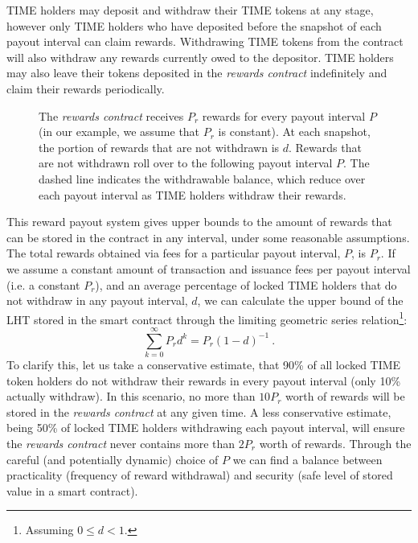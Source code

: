 \begin{multicols}{2}
TIME holders may deposit and withdraw their TIME tokens at any stage, however only TIME holders who have deposited before the snapshot of each payout interval can claim rewards. Withdrawing TIME tokens from the contract will also withdraw any rewards currently owed to the depositor. TIME holders may also leave their tokens deposited in the \textit{rewards contract} indefinitely and claim their rewards periodically. 
\begin{figure}[H]
	\centering
	\def\svgwidth{\columnwidth}
	
	\caption{The \textit{rewards contract} receives $P_r$ rewards for every payout interval $P$ (in our example, we assume that $P_r$ is constant). At each snapshot, the portion of rewards that are not withdrawn is $d$. Rewards that are not withdrawn roll over to the following payout interval $P$. The dashed line indicates the withdrawable balance, which reduce over each payout interval as TIME holders withdraw their rewards.}
	\label{fig:time-withdraw}
\end{figure}
\vspace{-0.2cm}
This reward payout system gives upper bounds to the amount of rewards that can be stored in the contract in any interval, under some reasonable assumptions. The total rewards obtained via fees for a particular payout interval, $P$, is $P_r$. If we assume a constant amount of transaction and issuance fees per payout interval (i.e. a constant $P_r$), and an average percentage of locked TIME holders that do not withdraw in any payout interval, $d$, we can calculate the upper bound of the LHT stored in the smart contract through the limiting geometric series relation\footnote{Assuming $0 \le d <1$.}:
\begin{equation}
  \sum_{k=0}^{\infty} P_r d^k = P_r (1-d)^{-1} ~.
  \label{eq:upperbound}
\end{equation}
To clarify this, let us take a conservative estimate, that  90\% of all locked TIME token holders do not withdraw their rewards in every payout interval (only 10\% actually withdraw). In this scenario, no more than $10 P_r$ worth of rewards will be stored in the \textit{rewards contract} at any given time. A less conservative estimate, being 50\% of locked TIME holders withdrawing each payout interval, will ensure the \textit{rewards contract} never contains more than $2P_r$ worth of rewards. Through the careful (and potentially dynamic) choice of $P$ we can find a balance between practicality (frequency of reward withdrawal) and security (safe level of stored value in a smart contract).  


\end{multicols}

